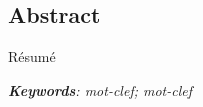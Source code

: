 {}

\vspace*{-1cm}
\begin{flushright}
	\section*{\fontsize{20pt}{20pt}\selectfont\textnormal{Abstract}}
\end{flushright}
\vspace{2cm}

\chead[\fancyplain{}{}]
{\fancyplain{}{}}
\lfoot[\fancyplain{}{}]%
{\fancyplain{}{}}
\cfoot[\fancyplain{}{\thepage}]
{\fancyplain{}{\thepage}}
\rfoot[\fancyplain{}{}]%
{\fancyplain{}{\scriptsize}}



\minitoc

Résumé

\textit{\textbf{Keywords}: mot-clef; mot-clef}
